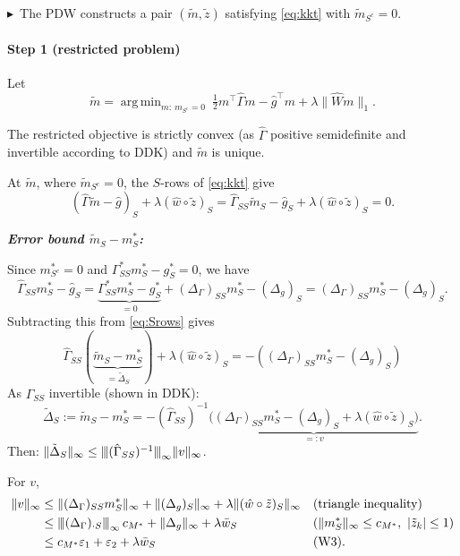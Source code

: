 \documentclass[11pt,a4paper]{article}
\numberwithin{equation}{section}
\theoremstyle{plain}
\theoremstyle{remark}
\newcommand{\opnorm}[1]{{\vert\kern-0.25ex\vert\kern-0.25ex\vert #1 \vert\kern-0.25ex\vert\kern-0.25ex\vert}}
\DeclareMathOperator*{\argmin}{arg\,min}
\newcommand{\changed}{$\blacktriangleright$\ }
\begin{document}
\changed The PDW constructs a pair $(\tilde m,\tilde z)$ satisfying \eqref{eq:kkt} with $\tilde m_{S^c}=0$.

\paragraph{Step 1 (restricted problem)} Let
\begin{equation}\label{eq:restricted}
\tilde m=\argmin_{m:\ m_{S^c}=0}\ \tfrac12m^\top\hat\Gamma m-\hat g^\top m+\lambda\|\hat Wm\|_1 .
\end{equation}

The restricted objective is strictly convex (as $\hat\Gamma$ positive semidefinite and invertible according to DDK) and $\tilde m$ is unique.


At $\tilde m$, where $\tilde m_{S^c}=0$, the $S$-rows of \ref{eq:kkt} give
\begin{equation}\label{eq:Srows}
(\hat\Gamma \tilde m - \hat g)_S + \lambda(\hat w\circ\tilde z)_S
  = \hat\Gamma_{SS}\tilde m_S - \hat g_S + \lambda(\hat w\circ\tilde z)_S = 0.
\end{equation}

\emph{\textbf{Error bound $\tilde{m}_S - m^*_S$:}} 

Since $m^*_{S^c}=0$ and $\Gamma^*_{SS}m^*_S-g^*_S = 0$, we have
\begin{equation*}
\hat\Gamma_{SS}m^*_S-\hat g_S= \underbrace{\Gamma_{SS}^*m^*_S - g^*_S}_{=0} + (\Delta_\Gamma)_{SS}m^*_S-(\Delta_g)_S = (\Delta_\Gamma)_{SS}m^*_S-(\Delta_g)_S .
\end{equation*}
Subtracting this from \eqref{eq:Srows} gives
\begin{equation*}
\hat\Gamma_{SS}(\underbrace{\tilde{m}_S-m^*_S}_{=\tilde\Delta_S}) + \lambda(\hat w\circ\tilde z)_S = -((\Delta_\Gamma)_{SS}m^*_S - (\Delta_g)_S)
\end{equation*}
As $\hat\Gamma_{SS}$ invertible (shown in DDK):
\[
\tilde\Delta_S:=\tilde m_S-m^*_S=-(\hat\Gamma_{SS})^{-1}\underbrace{\Big((\Delta_\Gamma)_{SS}m^*_S-(\Delta_g)_S+\lambda(\hat w\circ\tilde z)_S\Big)}_{=:v}.
\]
Then: $\|\tilde\Delta_S\|_\infty\le\opnorm{(\hat\Gamma_{SS})^{-1}}_\infty\|v\|_\infty$. 

For $v$,
\begin{align*}
\|v\|_\infty
&\le\|(\Delta_\Gamma)_{SS}m^*_S\|_\infty+\|(\Delta_g)_S\|_\infty+\lambda\|(\hat w\circ\tilde z)_S\|_\infty && \text{(triangle inequality)}\\
&\le\opnorm{(\Delta_\Gamma)_{\cdot S}}_\infty\,c_{M^*}+\|\Delta_g\|_\infty+\lambda\bar w_S && (\|m^*_S\|_\infty\le c_{M^*},\ |\tilde z_k|\le1)\\
&\le c_{M^*}\varepsilon_1+\varepsilon_2+\lambda\bar w_S && \text{(W3)}.
\end{align*}
\end{document}
